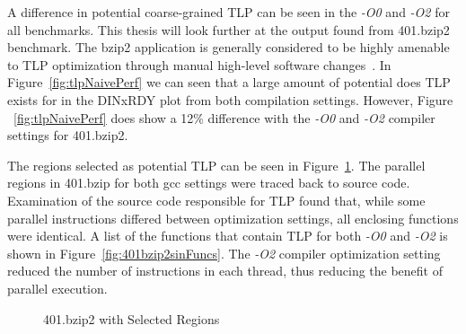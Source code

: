 \documentclass[defaultstyle,11pt]{thesis}
\begin{document}
A difference in potential coarse-grained TLP can be seen in the
\textit{-O0} and \textit{-O2} for all benchmarks.  This thesis will
look further at the output found from 401.bzip2 benchmark.  The bzip2
application is generally considered to be highly amenable to TLP
optimization through manual high-level software
changes~\cite{gilchrist:04:pdcs}.  In Figure~\ref{fig:tlpNaivePerf} we
can seen that a large amount of potential does TLP exists for in the
DINxRDY plot from both compilation settings.  However, Figure
~\ref{fig:tlpNaivePerf} does show a 12\% difference with the
\textit{-O0} and \textit{-O2} compiler settings for 401.bzip2.

The regions selected as potential TLP can be seen in
Figure~\ref{fig:401regions}.  The parallel regions in 401.bzip for
both gcc settings were traced back to source code.  Examination of the
source code responsible for TLP found that, while some parallel
instructions differed between optimization settings, all enclosing
functions were identical.  A list of the functions that contain TLP
for both \textit{-O0} and \textit{-O2} is shown in
Figure~\ref{fig:401bzip2sinFuncs}.  The \textit{-O2} compiler
optimization setting reduced the number of instructions in each
thread, thus reducing the benefit of parallel execution.

\begin{figure}
  \centering
  \hspace{5mm}
  \caption{401.bzip2 with Selected Regions}
  \label{fig:401regions}
\end{figure}
\end{document}
